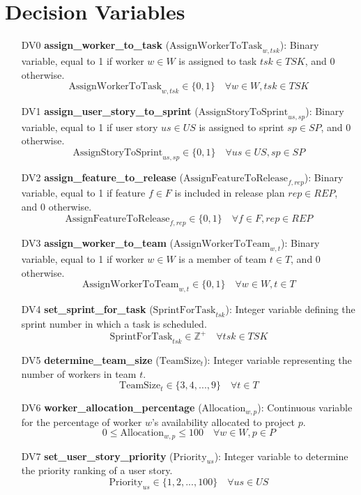 \documentclass{article}
\begin{document}
\section{Decision Variables}
\begin{itemize}
    \item[DV0] \textbf{assign\_worker\_to\_task} ($\text{AssignWorkerToTask}_{w, tsk}$): Binary variable, equal to 1 if worker $w \in W$ is assigned to task $tsk \in TSK$, and 0 otherwise.
    \[ \text{AssignWorkerToTask}_{w, tsk} \in \{0, 1\} \quad \forall w \in W, tsk \in TSK \]
    \item[DV1] \textbf{assign\_user\_story\_to\_sprint} ($\text{AssignStoryToSprint}_{us, sp}$): Binary variable, equal to 1 if user story $us \in US$ is assigned to sprint $sp \in SP$, and 0 otherwise.
    \[ \text{AssignStoryToSprint}_{us, sp} \in \{0, 1\} \quad \forall us \in US, sp \in SP \]
    \item[DV2] \textbf{assign\_feature\_to\_release} ($\text{AssignFeatureToRelease}_{f, rep}$): Binary variable, equal to 1 if feature $f \in F$ is included in release plan $rep \in REP$, and 0 otherwise.
    \[ \text{AssignFeatureToRelease}_{f, rep} \in \{0, 1\} \quad \forall f \in F, rep \in REP \]
    \item[DV3] \textbf{assign\_worker\_to\_team} ($\text{AssignWorkerToTeam}_{w, t}$): Binary variable, equal to 1 if worker $w \in W$ is a member of team $t \in T$, and 0 otherwise.
    \[ \text{AssignWorkerToTeam}_{w, t} \in \{0, 1\} \quad \forall w \in W, t \in T \]
    \item[DV4] \textbf{set\_sprint\_for\_task} ($\text{SprintForTask}_{tsk}$): Integer variable defining the sprint number in which a task is scheduled.
    \[ \text{SprintForTask}_{tsk} \in \mathbb{Z}^+ \quad \forall tsk \in TSK \]
    \item[DV5] \textbf{determine\_team\_size} ($\text{TeamSize}_{t}$): Integer variable representing the number of workers in team $t$.
    \[ \text{TeamSize}_{t} \in \{3, 4, ..., 9\} \quad \forall t \in T \]
    \item[DV6] \textbf{worker\_allocation\_percentage} ($\text{Allocation}_{w, p}$): Continuous variable for the percentage of worker $w$'s availability allocated to project $p$.
    \[ 0 \le \text{Allocation}_{w, p} \le 100 \quad \forall w \in W, p \in P \]
    \item[DV7] \textbf{set\_user\_story\_priority} ($\text{Priority}_{us}$): Integer variable to determine the priority ranking of a user story.
    \[ \text{Priority}_{us} \in \{1, 2, ..., 100\} \quad \forall us \in US \]
\end{itemize}
\end{document}
